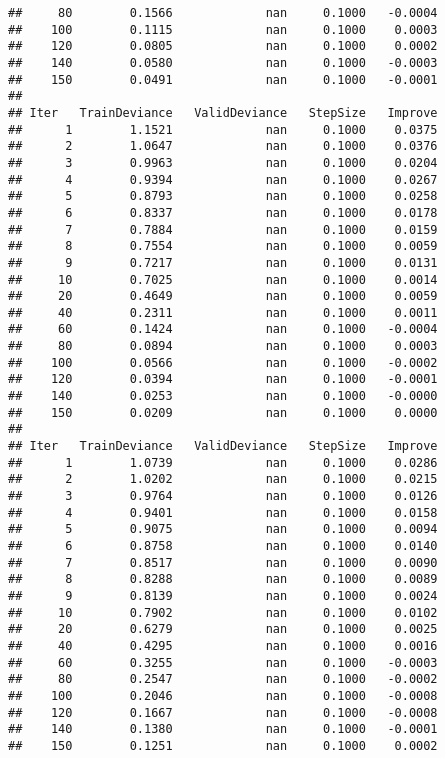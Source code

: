 \documentclass[]{article}
\begin{document}
\begin{verbatim}
##     80        0.1566             nan     0.1000   -0.0004
##    100        0.1115             nan     0.1000    0.0003
##    120        0.0805             nan     0.1000    0.0002
##    140        0.0580             nan     0.1000   -0.0003
##    150        0.0491             nan     0.1000   -0.0001
## 
## Iter   TrainDeviance   ValidDeviance   StepSize   Improve
##      1        1.1521             nan     0.1000    0.0375
##      2        1.0647             nan     0.1000    0.0376
##      3        0.9963             nan     0.1000    0.0204
##      4        0.9394             nan     0.1000    0.0267
##      5        0.8793             nan     0.1000    0.0258
##      6        0.8337             nan     0.1000    0.0178
##      7        0.7884             nan     0.1000    0.0159
##      8        0.7554             nan     0.1000    0.0059
##      9        0.7217             nan     0.1000    0.0131
##     10        0.7025             nan     0.1000    0.0014
##     20        0.4649             nan     0.1000    0.0059
##     40        0.2311             nan     0.1000    0.0011
##     60        0.1424             nan     0.1000   -0.0004
##     80        0.0894             nan     0.1000    0.0003
##    100        0.0566             nan     0.1000   -0.0002
##    120        0.0394             nan     0.1000   -0.0001
##    140        0.0253             nan     0.1000   -0.0000
##    150        0.0209             nan     0.1000    0.0000
## 
## Iter   TrainDeviance   ValidDeviance   StepSize   Improve
##      1        1.0739             nan     0.1000    0.0286
##      2        1.0202             nan     0.1000    0.0215
##      3        0.9764             nan     0.1000    0.0126
##      4        0.9401             nan     0.1000    0.0158
##      5        0.9075             nan     0.1000    0.0094
##      6        0.8758             nan     0.1000    0.0140
##      7        0.8517             nan     0.1000    0.0090
##      8        0.8288             nan     0.1000    0.0089
##      9        0.8139             nan     0.1000    0.0024
##     10        0.7902             nan     0.1000    0.0102
##     20        0.6279             nan     0.1000    0.0025
##     40        0.4295             nan     0.1000    0.0016
##     60        0.3255             nan     0.1000   -0.0003
##     80        0.2547             nan     0.1000   -0.0002
##    100        0.2046             nan     0.1000   -0.0008
##    120        0.1667             nan     0.1000   -0.0008
##    140        0.1380             nan     0.1000   -0.0001
##    150        0.1251             nan     0.1000    0.0002

\end{verbatim}
\end{document}

